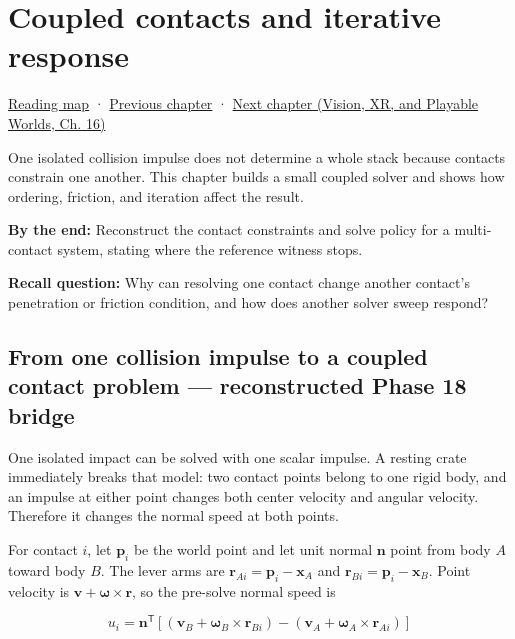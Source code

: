 \chapter{Coupled contacts and iterative response}\label{06-engine-ii-ch040-coupled-contacts-and-iterative-response}\hypertarget{06-engine-ii-ch040}{}\label{stagechapter:06-engine-ii-ch040}

\hyperref[volume-reading-map]{Reading map} · \hyperref[06-engine-ii-ch039-composable-timesteps-and-stable-simulation-policy]{Previous chapter} · \href{../07-Vision-XR-and-Playable-Worlds/main.pdf\#nameddest=06-engine-ii-ch041-evidence-tools-and-revisable-design}{Next chapter (Vision, XR, and Playable Worlds, Ch. 16)}

One isolated collision impulse does not determine a whole stack because contacts constrain one another. This chapter builds a small coupled solver and shows how ordering, friction, and iteration affect the result.

\textbf{By the end:} Reconstruct the contact constraints and solve policy for a multi-contact system, stating where the reference witness stops.

\textbf{Recall question:} Why can resolving one contact change another contact's penetration or friction condition, and how does another solver sweep respond?

\section{From one collision impulse to a coupled contact problem --- reconstructed Phase 18 bridge}\label{06-engine-ii-ch040-from-one-collision-impulse-to-a-coupled-contact-problem-reconstructed-phase-18-bridge}

One isolated impact can be solved with one scalar impulse. A resting crate immediately breaks that model: two contact points belong to one rigid body, and an impulse at either point changes both center velocity and angular velocity. Therefore it changes the normal speed at both points.

For contact \(i\), let \(\mathbf p_i\) be the world point and let unit normal \(\mathbf n\) point from body \(A\) toward body \(B\). The lever arms are \(\mathbf r_{Ai}=\mathbf p_i-\mathbf x_A\) and \(\mathbf r_{Bi}=\mathbf p_i-\mathbf x_B\). Point velocity is \(\mathbf v+\boldsymbol\omega\times\mathbf r\), so the pre-solve normal speed is

\[
u_i=\mathbf n^\mathsf T\left[(\mathbf v_B+\boldsymbol\omega_B\times\mathbf r_{Bi})-(\mathbf v_A+\boldsymbol\omega_A\times\mathbf r_{Ai})\right]
\]

